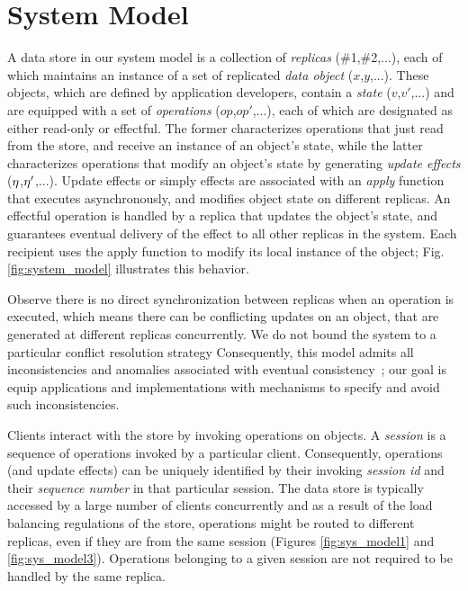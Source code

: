 \section{System Model}
\label{sec:sys_model}

A data store in our system model is a collection of \emph{replicas}
(\#1,\#2,...), each of which maintains an instance of a set of
replicated \emph{data object} ($x$,$y$,...).  These objects, which are
defined by application developers, contain a \emph{state}
($v$,$v'$,...) and are equipped with a set of \emph{operations}
($op$,$op'$,...), each of which are designated as either read-only or
effectful.  The former characterizes operations that just read from
the store, and receive an instance of an object's state, while the
latter characterizes operations that modify an object's state by
generating \emph{update effects} ($\eta$,$\eta'$,...).  Update effects
or simply effects are associated with an \emph{apply} function that
executes asynchronously, and modifies object state on different
replicas.  An effectful operation is handled by a replica that updates
the object's state, and guarantees eventual delivery of the effect to
all other replicas in the system. Each recipient uses the apply
function to modify its local instance of the object;
Fig.\ref{fig:system_model} illustrates this behavior.

Observe there is no direct synchronization between replicas when an
operation is executed, which means there can be conflicting updates on
an object, that are generated at different replicas concurrently.  We
do not bound the system to a particular conflict resolution strategy
Consequently, this model admits all inconsistencies and anomalies
associated with eventual consistency~\cite{quelea}; our goal is equip
applications and implementations with mechanisms to specify and avoid
such inconsistencies.

Clients interact with the store by invoking operations on objects.
A \emph{session} is a sequence of operations invoked by a particular
client. Consequently, operations (and update effects) can be uniquely
identified by their invoking \emph{session id} and
their \emph{sequence number} in that particular session. The data
store is typically accessed by a large number of clients concurrently
and as a result of the load balancing regulations of the store,
operations might be routed to different replicas, even if they are
from the same session (Figures \ref{fig:sys_model1} and
\ref{fig:sys_model3}).  Operations belonging to a given session are
not required to be handled by the same replica.

